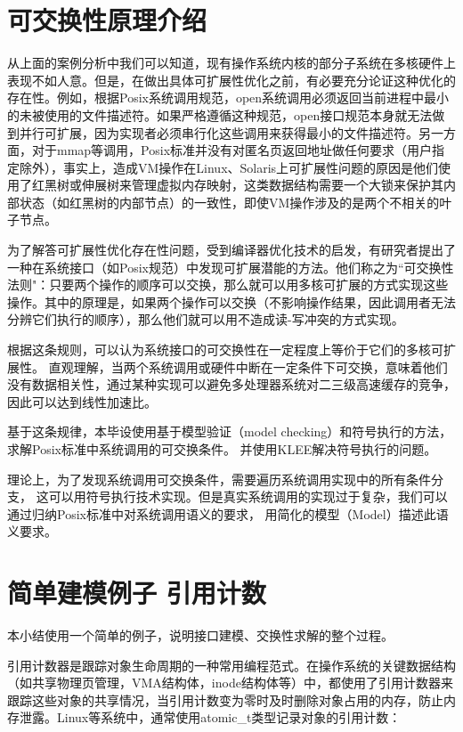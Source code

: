\section{可交换性原理介绍}

从上面的案例分析中我们可以知道，现有操作系统内核的部分子系统在多核硬件上表现不如人意。但是，在做出具体可扩展性优化之前，有必要充分论证这种优化的存在性。例如，根据Posix系统调用规范，open系统调用必须返回当前进程中最小的未被使用的文件描述符。如果严格遵循这种规范，open接口规范本身就无法做到并行可扩展，因为实现者必须串行化这些调用来获得最小的文件描述符。另一方面，对于mmap等调用，Posix标准并没有对匿名页返回地址做任何要求（用户指定除外），事实上，造成VM操作在Linux、Solaris上可扩展性问题的原因是他们使用了红黑树或伸展树来管理虚拟内存映射\cite{radixvm:eurosys13}，这类数据结构需要一个大锁来保护其内部状态（如红黑树的内部节点）的一致性，即使VM操作涉及的是两个不相关的叶子节点。

为了解答可扩展性优化存在性问题，受到编译器优化技术的启发，有研究者提出了一种在系统接口（如Posix规范）中发现可扩展潜能的方法。他们称之为``可交换性法则"：只要两个操作的顺序可以交换，那么就可以用多核可扩展的方式实现这些操作。其中的原理是，如果两个操作可以交换（不影响操作结果，因此调用者无法分辨它们执行的顺序），那么他们就可以用不造成读-写冲突的方式实现。

根据这条规则，可以认为系统接口的可交换性在一定程度上等价于它们的多核可扩展性。
直观理解，当两个系统调用或硬件中断在一定条件下可交换，意味着他们没有数据相关性，通过某种实现可以避免多处理器系统对二三级高速缓存的竞争，
因此可以达到线性加速比。

基于这条规律，本毕设使用基于模型验证（model
checking）和符号执行的方法，求解Posix标准中系统调用的可交换条件。
并使用KLEE\cite{Cadar:2008:KUA:1855741.1855756}解决符号执行的问题。

理论上，为了发现系统调用可交换条件，需要遍历系统调用实现中的所有条件分支，
这可以用符号执行技术实现。但是真实系统调用的实现过于复杂，我们可以通过归纳Posix标准中对系统调用语义的要求，
用简化的模型（Model）描述此语义要求。


\section{简单建模例子 \pozhehao 引用计数}
\label{sec:counter}
本小结使用一个简单的例子，说明接口建模、交换性求解的整个过程。

引用计数器是跟踪对象生命周期的一种常用编程范式。在操作系统的关键数据结构（如共享物理页管理，VMA结构体，inode结构体等）中，都使用了引用计数器来跟踪这些对象的共享情况，当引用计数变为零时及时删除对象占用的内存，防止内存泄露。Linux等系统中，通常使用atomic\_t类型记录对象的引用计数：

